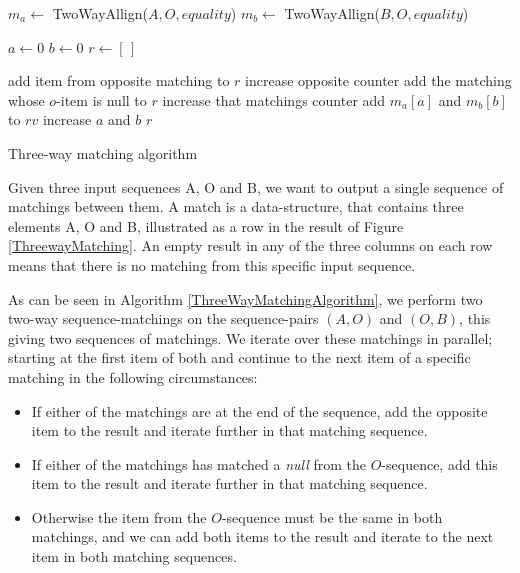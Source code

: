 \documentclass[11pt]{article}
\begin{document}
\begin{algorithm}
\begin{algorithmic}
	\State $m_a\gets$ TwoWayAllign($A, O, equality$)
	\State $m_b\gets$ TwoWayAllign($B, O, equality$)
	
	\State $a \gets 0$
	\State $b \gets 0$
	\State $r \gets [\,]$
	
			\State add item from opposite matching to $r$
			\State increase opposite counter
			\State add the matching whose $o$-item is null to $r$
			\State increase that matchings counter
		\Else
			\State add $m_a[a]$ and $m_b[b]$ to $rv$
			\State increase $a$ and $b$
		\EndIf
	\EndWhile
	\State \Return $r$
	
\EndFunction
\end{algorithmic}
\caption{Three-way matching algorithm}
  \label{ThreeWayMatchingAlgorithm}
\end{algorithm}

Given three input sequences A, O and B, we want to output a single sequence of matchings between them. A match is a data-structure, that contains three elements A, O and B, illustrated as a row in the result of Figure \ref{ThreewayMatching}. An empty result in any of the three columns on each row means that there is no matching from this specific input sequence.

As can be seen in Algorithm \ref{ThreeWayMatchingAlgorithm}, we perform two two-way sequence-matchings on the sequence-pairs $(A, O)$ and $(O, B)$, this giving two sequences of matchings.  We iterate over these matchings in parallel; starting at the first item of both and continue to the next item of a specific matching in the following circumstances:

\begin{itemize}
	\item If either of the matchings are at the end of the sequence, add the opposite item to the result and iterate further in that matching sequence.
	\item If either of the matchings has matched a \textit{null} from the $O$-sequence, add this item to the result and iterate further in that matching sequence.
	\item Otherwise the item from the $O$-sequence must be the same in both matchings, and we can add both items to the result and iterate to the next item in both matching sequences.
\end{itemize}
\end{document}
